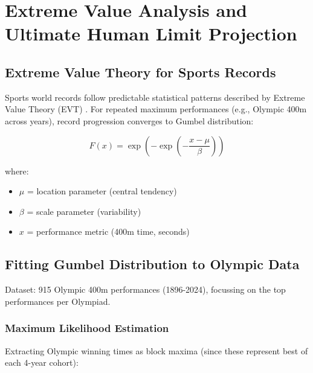\section{Extreme Value Analysis and Ultimate Human Limit Projection}

\subsection{Extreme Value Theory for Sports Records}

Sports world records follow predictable statistical patterns described by Extreme Value Theory (EVT) \citep{Einmahl2008, Gembris2002}. For repeated maximum performances (e.g., Olympic 400m across years), record progression converges to Gumbel distribution:

\begin{equation}
F(x) = \exp\left(-\exp\left(-\frac{x-\mu}{\beta}\right)\right)
\end{equation}

where:
\begin{itemize}
    \item $\mu$ = location parameter (central tendency)
    \item $\beta$ = scale parameter (variability)
    \item $x$ = performance metric (400m time, seconds)
\end{itemize}

\subsection{Fitting Gumbel Distribution to Olympic Data}

Dataset: 915 Olympic 400m performances (1896-2024), focussing on the top performances per Olympiad.

\subsubsection{Maximum Likelihood Estimation}

Extracting Olympic winning times as block maxima (since these represent best of each 4-year cohort):

